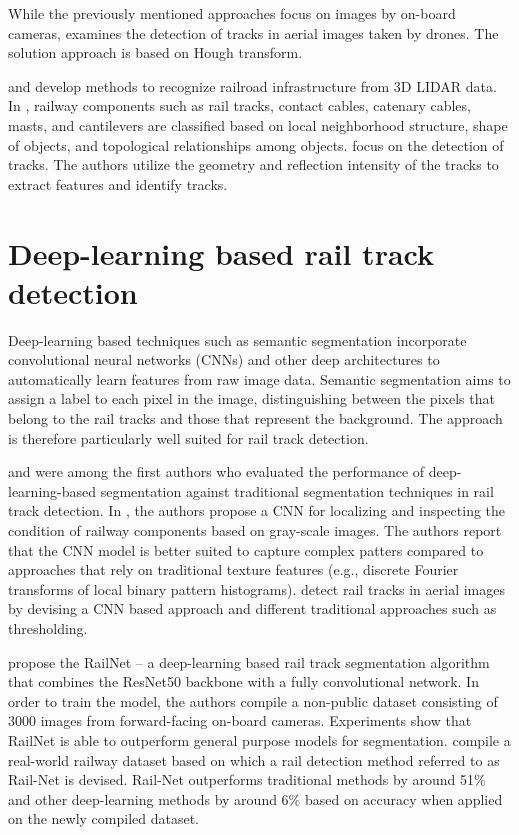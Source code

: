 \documentclass[Master,MDS,english]{BASE/twbook} %
\begin{document}
While the previously mentioned approaches focus on images by on-board cameras, \cite{7952544} examines the detection of tracks in aerial images taken by drones. The solution approach is based on Hough transform.

\cite{rs71114916} and \cite{6783695} develop methods to recognize railroad infrastructure from 3D LIDAR data.
In \cite{rs71114916}, railway components such as rail tracks, contact cables, catenary cables, masts, and cantilevers are classified based on local neighborhood structure, shape of objects, and topological relationships among objects. 
\cite{6783695} focus on the detection of tracks. The authors utilize the geometry and reflection intensity of the tracks to
extract features and identify tracks.


\section{Deep-learning based rail track detection}

Deep-learning based techniques such as semantic segmentation incorporate convolutional neural networks (CNNs) and other deep architectures to automatically learn features from raw image data. Semantic segmentation aims to assign a label to each pixel in the image, distinguishing between the pixels that belong to the rail tracks and those that represent the background. The approach is therefore particularly well suited for rail track detection. 

\cite{7350873} and \cite{8517865} were among the first authors who evaluated the performance of deep-learning-based segmentation against traditional segmentation techniques in rail track detection. 
In \cite{7350873}, the authors propose a CNN for localizing and inspecting the condition of railway components based on gray-scale images. The authors report that the CNN model is better suited to capture complex patters compared to approaches that rely on traditional texture features (e.g., discrete Fourier transforms of local binary pattern histograms). 
\cite{8517865} detect rail tracks in aerial images by devising a CNN based approach and different traditional approaches such as thresholding. 

\cite{8859360} propose the RailNet -- a deep-learning based rail track segmentation algorithm that combines the ResNet50 backbone with a fully convolutional network. In order to train the model, the authors compile a non-public dataset consisting of 3000 images from forward-facing on-board cameras. Experiments show that RailNet is able to outperform general purpose models for segmentation.
\cite{10.1145/3503161.3548050} compile a real-world railway dataset based on which a rail detection method referred to as Rail-Net is devised. Rail-Net outperforms traditional methods by around 51\% and other deep-learning methods by around 6\% based on accuracy when applied on the newly compiled dataset. 
\end{document}
